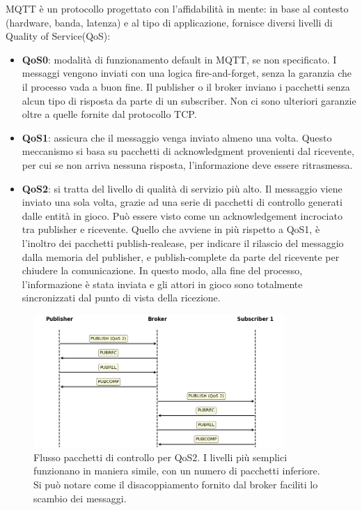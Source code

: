 MQTT è un protocollo progettato con l'affidabilità in mente: in base al contesto (hardware, banda, latenza) e al tipo di applicazione, fornisce diversi livelli di Quality of Service(QoS):

\begin{itemize}
	\item \textbf{QoS0}: modalità di funzionamento default in MQTT, se non specificato. I messaggi vengono inviati con una logica fire-and-forget, senza la garanzia che il processo vada a buon fine. Il publisher o il broker inviano i pacchetti senza alcun tipo di risposta da parte di un subscriber. Non ci sono ulteriori garanzie oltre a quelle fornite dal protocollo TCP.
	\item \textbf{QoS1}: assicura che il messaggio venga inviato almeno una volta. Questo meccanismo si basa su pacchetti di acknowledgment provenienti dal ricevente, per cui se non arriva nessuna risposta, l'informazione deve essere ritrasmessa.
	\item \textbf{QoS2}: si tratta del livello di qualità di servizio più alto. Il messaggio viene inviato una sola volta, grazie ad una serie di pacchetti di controllo generati dalle entità in gioco. Può essere visto come un acknowledgement incrociato tra publisher e ricevente. Quello che avviene in più rispetto a QoS1, è l'inoltro dei pacchetti publish-realease, per indicare il rilascio del messaggio dalla memoria del publisher, e publish-complete da parte del ricevente per chiudere la comunicazione. In questo modo, alla fine del processo, l'informazione è stata inviata e gli attori in gioco sono totalmente sincronizzati dal punto di vista della ricezione.   
\end{itemize}

\begin{figure}[htbp]
    \centering
    \includegraphics[width=0.85\textwidth]{figures/qos2.png}
    \caption{Flusso pacchetti di controllo per QoS2. I livelli più semplici funzionano in maniera simile, con un numero di pacchetti inferiore. Si può notare come il disacoppiamento fornito dal broker faciliti lo scambio dei messaggi.}
    \label{fig:qos2}
\end{figure}





